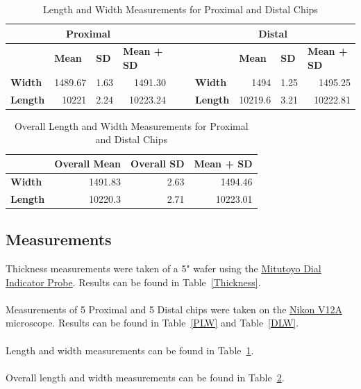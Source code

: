 \documentclass[12pt]{article}
\numberwithin{equation}{section}
\numberwithin{table}{section}
\numberwithin{figure}{section}
\begin{document}

\begin{table}[]
\centering
\caption{Length and Width Measurements for Proximal and Distal Chips}
\label{PDLW}
\begin{tabular}{@{}lrrrll|lrrr@{}}
\toprule
\multicolumn{4}{c}{\textbf{Proximal}} & \textbf{} & \textbf{} & \multicolumn{4}{c}{\textbf{Distal}} \\ \midrule
 & \multicolumn{1}{l}{\textbf{Mean}} & \multicolumn{1}{l}{\textbf{SD}} & \multicolumn{1}{l}{\textbf{Mean + SD}} & \textbf{} & \textbf{} &  & \multicolumn{1}{l}{\textbf{Mean}} & \multicolumn{1}{l}{\textbf{SD}} & \multicolumn{1}{l}{\textbf{Mean + SD}} \\
\textbf{Width} & 1489.67 & 1.63 & 1491.30 &  &  & \textbf{Width} & 1494 & 1.25 & 1495.25 \\
\textbf{Length} & 10221 & 2.24 & 10223.24 &  &  & \textbf{Length} & 10219.6 & 3.21 & 10222.81 \\ \bottomrule
\end{tabular}
\end{table}

\begin{table}[]
\centering
\caption{Overall Length and Width Measurements for Proximal and Distal Chips}
\label{OPDLW}
\begin{tabular}{@{}lrrr@{}}
\toprule
 & \multicolumn{1}{l}{\textbf{Overall Mean}} & \multicolumn{1}{l}{\textbf{Overall SD}} & \multicolumn{1}{l}{\textbf{Mean + SD}} \\ \midrule
\textbf{Width} & 1491.83 & 2.63 & 1494.46 \\
\textbf{Length} & 10220.3 & 2.71 & 10223.01 \\ \bottomrule
\end{tabular}
\end{table}


\subsection{Measurements}
Thickness measurements were taken of a 5" wafer using the \href{https://coral.nanofab.utah.edu/lab/equipment/show_eq/Mitutoyo+Dial+Indicator+Probe}{Mitutoyo Dial Indicator Probe}. Results can be found in Table~\ref{Thickness}.
\\~\\
Measurements of 5 Proximal and 5 Distal chips were taken on the \href{https://coral.nanofab.utah.edu/lab/equipment/show_eq/Nikon+V12A}{Nikon V12A} microscope. Results can be found in Table~\ref{PLW} and Table~\ref{DLW}.
\\~\\
Length and width measurements can be found in Table~\ref{PDLW}.
\\~\\
Overall length and width measurements can be found in Table~\ref{OPDLW}.
\end{document}
